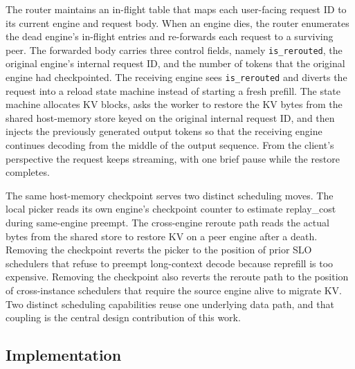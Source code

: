 The router maintains an in-flight table that maps each user-facing request ID to its current engine and request body. When an engine dies, the router enumerates the dead engine's in-flight entries and re-forwards each request to a surviving peer. The forwarded body carries three control fields, namely \texttt{is\_rerouted}, the original engine's internal request ID, and the number of tokens that the original engine had checkpointed. The receiving engine sees \texttt{is\_rerouted} and diverts the request into a reload state machine instead of starting a fresh prefill. The state machine allocates KV blocks, asks the worker to restore the KV bytes from the shared host-memory store keyed on the original internal request ID, and then injects the previously generated output tokens so that the receiving engine continues decoding from the middle of the output sequence. From the client's perspective the request keeps streaming, with one brief pause while the restore completes.


The same host-memory checkpoint serves two distinct scheduling moves. The local picker reads its own engine's checkpoint counter to estimate replay\_cost during same-engine preempt. The cross-engine reroute path reads the actual bytes from the shared store to restore KV on a peer engine after a death. Removing the checkpoint reverts the picker to the position of prior SLO schedulers that refuse to preempt long-context decode because reprefill is too expensive. Removing the checkpoint also reverts the reroute path to the position of cross-instance schedulers that require the source engine alive to migrate KV. Two distinct scheduling capabilities reuse one underlying data path, and that coupling is the central design contribution of this work.

\subsection{Implementation}


